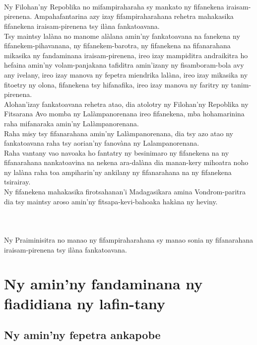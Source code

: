 \documentclass[12pt]{article}
\newcounter{laharana}
\newcommand{\andininy}[0]{
  \paragraph{%
    \NoCaseChange{%
      Andininy~\addtocounter{laharana}{1}\thelaharana.}\label{and:\thelaharana}~%
  }%
}
\begin{document}
\andininy{}Ny Filohan'ny Repoblika no mifampiraharaha sy mankato ny fifanekena
iraisam-pirenena.  Ampahafantarina azy izay fifampiraharahana rehetra mahakasika
fifanekena iraisam-pirenena tsy ilàna fankatoavana.\\

\noindent
Tsy maintsy lalàna no manome alàlana amin'ny fankatoavana na fanekena ny
fifanekem-pihavanana, ny fifanekem-barotra, ny fifanekena na fifanarahana
mikasika ny fandaminana iraisam-pirenena, ireo izay mampiditra andraikitra ho
hefaina amin'ny volam-panjakana tafiditra amin'izany ny fisamboram-bola avy any
ivelany, ireo izay manova ny fepetra miendrika lalàna, ireo izay mikasika ny
fitoetry ny olona, fifanekena tsy hifanafika, ireo izay manova ny faritry ny
tanim-pirenena.\\

\noindent
Alohan'izay fankatoavana rehetra atao, dia atolotry ny Filohan'ny Repoblika ny
Fitsarana Avo momba ny Lalàmpanorenana ireo fifanekena, mba hohamarinina raha
mifanaraka amin'ny Lalàmpanorenana.\\

\noindent
Raha misy tsy fifanarahana amin'ny Lalàmpanorenana, dia tsy azo atao ny
fankatoavana raha tsy aorian'ny fanovàna ny Lalampanorenana.\\

\noindent
Raha vantany vao navoaka ho fantatry ny besinimaro ny fifanekena na ny
fifanarahana nankatoavina na nekena ara-dalàna dia manan-kery mihoatra noho ny
lalàna raha toa ampiharin'ny ankilany ny fifanarahana na ny fifanekena
tsirairay.\\

\noindent
Ny fifanekena mahakasika firotsahanan'i Madagasikara amina Vondrom-paritra dia
tsy maintsy aroso amin'ny fitsapa-kevi-bahoaka hakàna ny heviny.

\andininy{}Ny Praiminisitra no manao ny fifampiraharahana sy manao sonia ny
fifanarahana iraisam-pirenena tsy ilàna fankatoavana.

\section{Ny amin'ny fandaminana ny fiadidiana ny lafin-tany}
\label{sec:ny-aminny-fand-1}

\subsection{Ny amin'ny fepetra ankapobe}
\label{sec:ny-aminny-fepetra}
\end{document}
